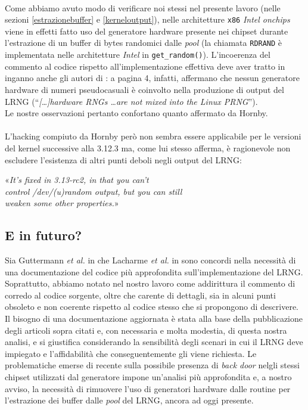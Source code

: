 \documentclass{article}
\begin{document}
 \paragraph{}Come abbiamo avuto modo di verificare noi
 stessi nel presente lavoro (nelle sezioni \ref{estrazionebuffer} e 
 \ref{kerneloutput}), nelle architetture \verb+x86+ \emph{Intel onchips} viene
 in effetti fatto uso del generatore hardware presente nei chipset durante
 l'estrazione di un buffer di bytes randomici dalle \emph{pool} (la
 chiamata \verb+RDRAND+ è implementata nelle architetture \emph{Intel} in
 \verb+get_random()+).
 L'incoerenza del commento al codice rispetto all'implementazione effettiva deve
 aver tratto in inganno anche gli autori di \cite{lach}: a pagina 4, infatti,
 affermano che nessun generatore hardware di numeri pseudocasuali è coinvolto
 nella produzione di output del LRNG (``\emph{[\ldots]hardware RNGs \ldots are
 not mixed into the Linux PRNG}'').\\
 Le nostre osservazioni pertanto confortano quanto affermato da Hornby.
 \paragraph{}L'hacking compiuto da Hornby però non sembra essere applicabile per
 le versioni del kernel successive alla 3.12.3 ma, come lui stesso afferma, è
 ragionevole non escludere l'esistenza di altri punti deboli negli output del
 LRNG:
 \begin{center}
 «\emph{It's fixed in 3.13-rc2, in that you can't \\
 control /dev/(u)random output, but you can still \\
 weaken some other properties.}»
 \end{center}
 
 \subsection{E in futuro?}
 Sia Guttermann \emph{et al.} in \cite{gutt} che Lacharme \emph{et al.} in
 \cite{lach} sono concordi nella necessità di una documentazione del codice più
 approfondita sull'implementazione del LRNG. Soprattutto, abbiamo notato
 nel nostro lavoro come addirittura il commento di corredo al codice sorgente, oltre
 che carente di dettagli, sia in alcuni punti obsoleto e non coerente rispetto
 al codice stesso che si propongono di descrivere.
 Il bisogno di una documentazione aggiornata è stata alla base della
 pubblicazione degli articoli sopra citati e, con necessaria e molta modestia,
 di questa nostra analisi, e si giustifica considerando la sensibilità degli
 scenari in cui il LRNG deve impiegato e l'affidabilità che conseguentemente
 gli viene richiesta.
 Le problematiche emerse di recente sulla possibile presenza di \emph{back door}
 nelgli stessi chipset utilizzati dal generatore impone un'analisi più
 approfondita e, a nostro avviso, la necessità di rimuovere l'uso
 di generatori hardware dalle routine per l'estrazione dei buffer dalle
 \emph{pool} del LRNG, ancora ad oggi presente.
 
\end{document}
